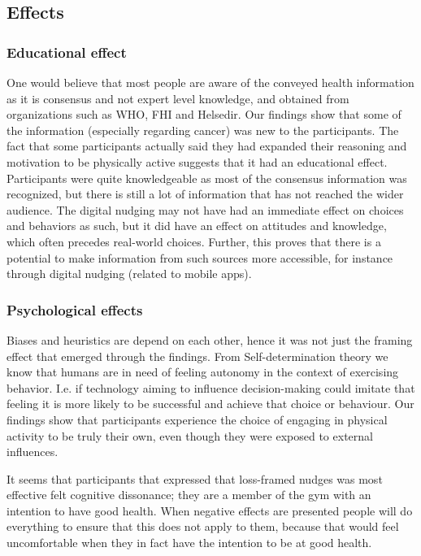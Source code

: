 \subsection{Effects}
\subsubsection{Educational effect}
One would believe that most people are aware of the conveyed health information as it is consensus and not expert level knowledge, and obtained from organizations such as WHO, FHI and Helsedir. Our findings show that some of the information (especially regarding cancer) was new to the participants. The fact that some participants actually said they had expanded their reasoning and motivation to be physically active suggests that it had an educational effect. Participants were quite knowledgeable as most of the consensus information was recognized, but there is still a lot of information that has not reached the wider audience. The digital nudging may not have had an immediate effect on choices and behaviors as such, but it did have an effect on attitudes and knowledge, which often precedes real-world choices. Further, this proves that there is a potential to make information from such sources more accessible, for instance through digital nudging (related to mobile apps). 

\subsubsection{Psychological effects}
Biases and heuristics are depend on each other, hence it was not just the framing effect that emerged through the findings. From Self-determination theory we know that humans are in need of feeling autonomy in the context of exercising behavior\cite{orji_persuasive_2018}. I.e. if technology aiming to influence decision-making could imitate that feeling it is more likely to be successful and achieve that choice or behaviour. Our findings show that participants experience the choice of engaging in physical activity to be truly their own, even though they were exposed to external influences. 

It seems that participants that expressed that loss-framed nudges was most effective felt cognitive dissonance; they are a member of the gym with an intention to have good health. When negative effects are presented people will do everything to ensure that this does not apply to them, because that would feel uncomfortable when they in fact have the intention to be at good health. 


